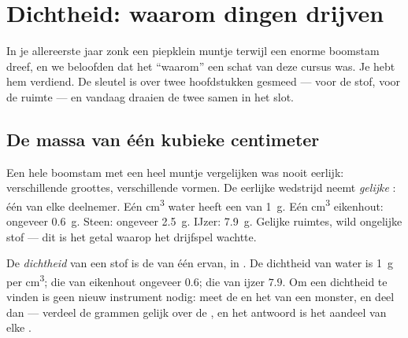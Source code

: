 \chapter{Dichtheid: waarom dingen drijven}\label{ch:g6:density-floating}

In je allereerste jaar zonk een piepklein muntje terwijl een enorme
boomstam dreef, en we beloofden dat het ``waarom'' een schat van deze
cursus was. Je hebt hem verdiend. De sleutel is over twee hoofdstukken
gesmeed ---  voor de stof,  voor de ruimte --- en vandaag
draaien de twee samen in het slot.

\section{De massa van één kubieke centimeter}

\begin{example}\label{ex:g6:density-floating:fair}
Een hele boomstam met een heel muntje vergelijken was nooit eerlijk:
verschillende groottes, verschillende vormen. De eerlijke wedstrijd
neemt \emph{gelijke }: één  van elke
deelnemer. Eén \unit{cm^3} water heeft een  van \qty{1}{g}. Eén
\unit{cm^3} eikenhout: ongeveer \qty{0.6}{g}. Steen: ongeveer
\qty{2.5}{g}. IJzer: \qty{7.9}{g}. Gelijke ruimtes, wild ongelijke
stof --- dit is het getal waarop het drijfspel wachtte.
\end{example}

\begin{definition}[Dichtheid]\label{def:g6:density-floating:density}
De \emph{dichtheid} van een stof is de  van
één  ervan, in . De dichtheid van water is
\qty{1}{g} per \unit{cm^3}; die van eikenhout ongeveer $0.6$; die van
ijzer $7.9$. Om een dichtheid te vinden is geen nieuw instrument
nodig: meet de  en het  van een monster, en deel dan
--- verdeel de grammen gelijk over de , en het
antwoord is het aandeel van elke .
\end{definition}

